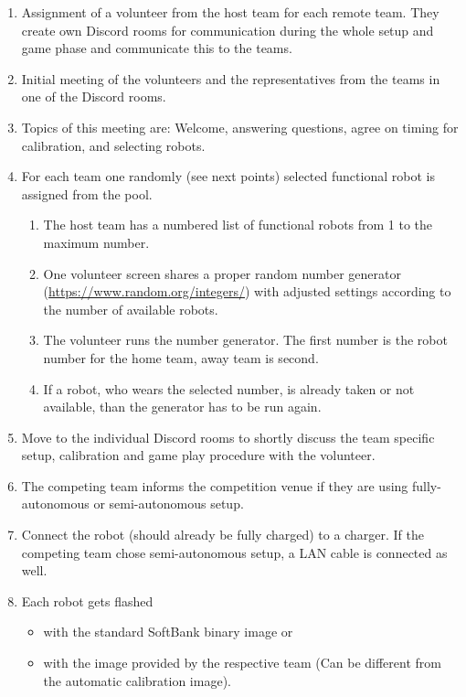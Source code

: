     \begin{enumerate}
        \item Assignment of a volunteer from the host team for each remote team. They create own Discord rooms for communication during the whole setup and game phase and communicate this to the teams.
        \item Initial meeting of the volunteers and the representatives from the teams in one of the Discord rooms.
        \item Topics of this meeting are: Welcome, answering questions, agree on timing for calibration, and selecting robots.
		\item For each team one randomly (see next points) selected functional robot is assigned from the pool.
		\begin{enumerate}
            \item The host team has a numbered list of functional robots from 1 to the maximum number.
            \item One volunteer screen shares a proper random number generator (\url{https://www.random.org/integers/}) with adjusted settings according to the number of available robots.
            \item The volunteer runs the number generator. The first number is the robot number for the home team, away team is second.
            \item If a robot, who wears the selected number, is already taken or not available, than the generator has to be run again. 
        \end{enumerate} 
        \item Move to the individual Discord rooms to shortly discuss the team specific setup, calibration and game play procedure with the volunteer.
        \item The competing team informs the competition venue if they are using fully-autonomous or semi-autonomous setup.
        \item Connect the robot (should already be fully charged) to a charger. If the competing team chose semi-autonomous setup, a LAN cable is connected as well.
        \item Each robot gets flashed 
        \begin{itemize}
            \item with the standard SoftBank binary image or
            \item with the image provided by the respective team (Can be different from the automatic calibration image).
		\end{itemize}

\end{enumerate}

